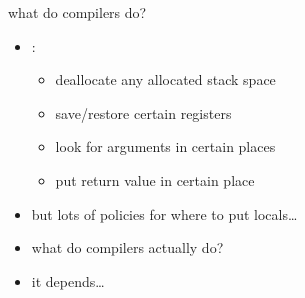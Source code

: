 \begin{frame}{what do compilers do?}
\begin{itemize}
\item {}:
\begin{itemize}
    \item deallocate any allocated stack space
    \item save/restore certain registers
    \item look for arguments in certain places
    \item put return value in certain place
\end{itemize}
\item but lots of policies for where to put locals\ldots
\item what do compilers actually do?
\vspace{.5cm}
\item it depends\ldots
\end{itemize}
\end{frame}
